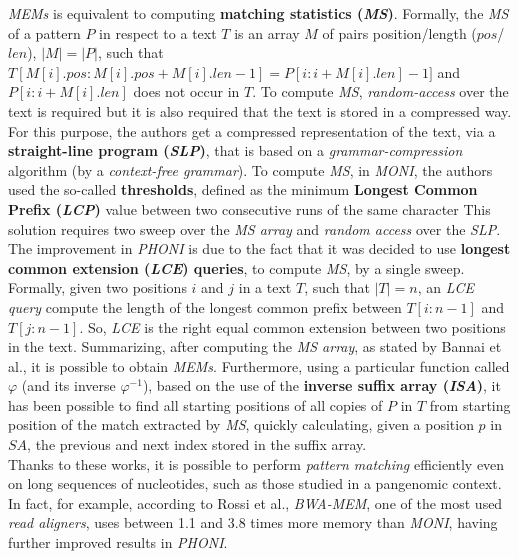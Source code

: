 \documentclass[a4paper,11pt, oneside]{article}
\begin{document}
\textit{MEMs} is equivalent to computing \textbf{matching statistics
  (\textit{MS})}. Formally, the \textit{MS} of a pattern $P$ in respect to a
text $T$ is an array $M$ of pairs position/length ($pos$/$len$), $|M|=|P|$, such
that $T[M[i].pos:M[i].pos+M[i].len-1]=P[i:i+M[i].len]-1]$ and $P[i:i+M[i].len]$
does not occur in $T$. To compute \textit{MS}, \textit{random-access} over the
text is required  but it is also required that the text is stored in a
compressed way. For this purpose, the authors get a compressed 
representation of the text, via a \textbf{straight-line program
(\textit{SLP})}, that is based on a \textit{grammar-compression} algorithm 
(by a \textit{context-free grammar}). To compute \textit{MS}, in \textit{MONI},
the authors used the so-called \textbf{thresholds}, defined as the minimum
\textbf{Longest Common Prefix (\textit{LCP})} value between two 
consecutive runs of the same character This solution requires two sweep over the
\textit{MS array} and \textit{random access} over the \textit{SLP}. The
improvement in \textit{PHONI} is due to the fact that it was decided to use
\textbf{longest common extension (\textit{LCE}) queries}, to compute
\textit{MS}, by a single sweep. Formally, given two positions $i$ and $j$ in a
text $T$, such that 
$|T|=n$, an \textit{LCE query} compute the length of the longest common prefix
between $T[i:n-1]$ and $T[j:n-1]$. So, \textit{LCE} is the right equal common
extension between two positions in the text. Summarizing, after computing the
\textit{MS array}, as stated by Bannai et al., it is possible to obtain
\textit{MEMs}. Furthermore, using a particular
function called $\varphi$ (and its inverse $\varphi^{-1}$), based on the use
of the \textbf{inverse suffix array (\textit{ISA})}, it has been possible to
find all starting positions of all copies of $P$ in $T$ from starting position
of the match extracted by \textit{MS}, quickly calculating, given a position $p$
in $SA$, the previous and next index stored in the suffix array. \\
Thanks to these works, it is
possible to perform \textit{pattern matching} 
efficiently even on long sequences of nucleotides, such as those studied in
a pangenomic context. In fact, for example, according to Rossi et al.,
\textit{BWA-MEM}, one of the most used \textit{read aligners}, uses between 1.1
and 3.8 times more memory than \textit{MONI}, having further improved results in
\textit{PHONI}.  
\end{document}
